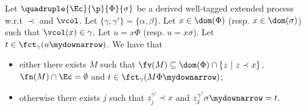\begin{lemma}
  \label{lem:FlawedColor and frame element direct element}
  Let $\quadruple{\Ec}{\p}{\Phi}{\sigma}$ be a derived well-tagged extended process w.r.t $\prec$ and $\vcol$. Let $\{\gamma,\gamma'\} = \{\alpha,\beta\}$. Let $x \in \dom(\Phi)$ (resp. $x \in \dom(\sigma)$) such that $\vcol(x) \in \gamma$. Let $u = x\Phi$ (resp. $u = x\sigma$). Let $t \in \fct_\gamma(u\mydownarrow)$. We have that 
  \begin{itemize}
  \item either there exists $M$ such that $\fv(M) \subseteq \dom(\Phi) \cap \{z ~|~ z \prec x\}$, $\fn(M) \cap \Ec = \emptyset$ and $t \in \fct_\gamma(M\Phi\mydownarrow)$; 
  \item otherwise there exists $j$ such that $z^{\gamma'}_j \prec x$ and $z^{\gamma'}_j\sigma\mydownarrow = t$.
  \end{itemize}
\end{lemma}

